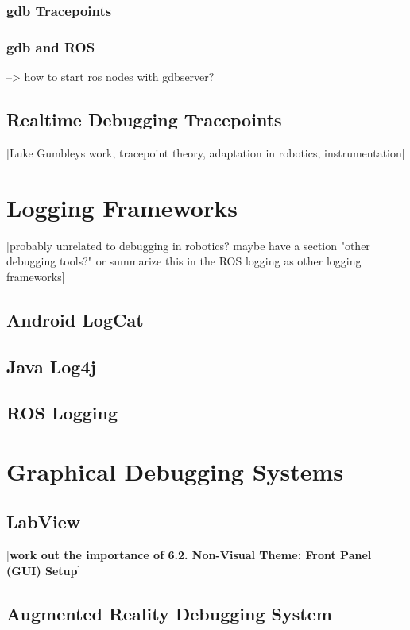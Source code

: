 \subsubsection{gdb Tracepoints}

\subsubsection{gdb and ROS}
--> how to start ros nodes with gdbserver?

\subsection{Realtime Debugging Tracepoints}
[Luke Gumbleys work, tracepoint theory, adaptation in robotics, instrumentation]
\cite{Gumbley2009}

\section{Logging Frameworks}

[probably unrelated to debugging in robotics? maybe have a section "other debugging tools?" or summarize this in the ROS logging as other logging frameworks]
\subsection{Android LogCat}
\subsection{Java Log4j}
\subsection{ROS Logging}

\section{Graphical Debugging Systems}
\subsection{LabView}
[\textbf{work out the importance of 6.2. Non-Visual Theme: Front Panel (GUI) Setup}]
\cite{Whitley2001}
\subsection{Augmented Reality Debugging System}
\cite{Collett2010}
